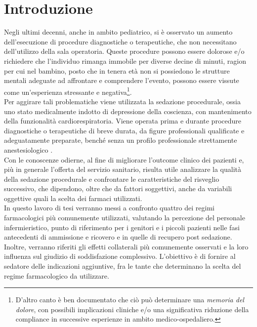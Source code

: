 \chapter{Introduzione}


Negli ultimi decenni, anche in ambito pediatrico, si è osservato un aumento dell'esecuzione di procedure diagnostiche o terapeutiche, che non necessitano dell'utilizzo della sala operatoria. Queste procedure possono essere dolorose e/o richiedere che l'individuo rimanga immobile per diverse decine di minuti, ragion per cui nel bambino, posto che in tenera età non si possiedono le strutture mentali adeguate ad affrontare e comprendere l'evento, possono essere vissute come un'esperienza stressante e negativa\footnote{D'altro canto è ben documentato \cite{Memoriadolorechir, Memoriadol2004, Memoryforpain1999} che ciò può determinare una \emph{memoria del dolore}, con possibili implicazioni cliniche e/o una significativa riduzione della compliance in successive esperienze in ambito medico-ospedaliero.}.
\\Per aggirare tali problematiche viene utilizzata la sedazione procedurale, ossia uno stato medicalmente indotto di depressione della coscienza, con mantenimento della funzionalità cardiorespiratoria. Viene operata prima e durante procedure diagnostiche o terapeutiche di breve durata, da figure professionali qualificate e adeguatamente preparate, benché senza un profilo professionale strettamente anestesiologico \cite{Krauss2006, Simeupsedazione}. 
\\Con le conoscenze odierne, al fine di migliorare l'outcome clinico dei pazienti e, più in generale l'offerta del servizio sanitario, risulta utile analizzare la qualità della sedazione procedurale e confrontare le caratteristiche del risveglio successivo, che dipendono, oltre che da fattori soggettivi, anche da variabili oggettive quali la scelta dei farmaci utilizzati. 
\\In questo lavoro di tesi verranno messi a confronto quattro dei regimi farmacologici più comunemente utilizzati, valutando la percezione del personale infermieristico, punto di riferimento per i genitori e i piccoli pazienti nelle fasi antecedenti di ammissione e ricovero e in quelle di recupero post sedazione. Inoltre, verranno riferiti gli effetti collaterali più comunemente osservati e la loro influenza sul giudizio di soddisfazione complessivo. L'obiettivo è di fornire al sedatore delle indicazioni aggiuntive, fra le tante che determinano la scelta del regime farmacologico da utilizzare.

